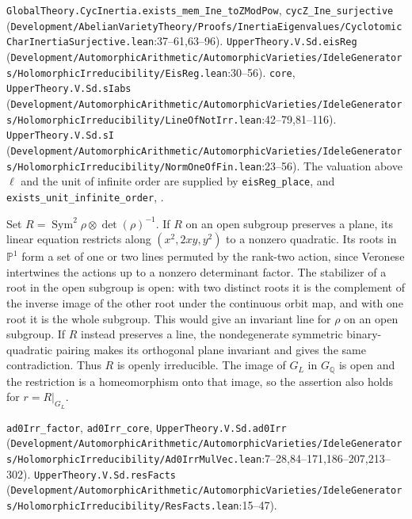 {\footnotesize \nolinkurl{GlobalTheory.CycInertia.exists_mem_Ine_toZModPow}, \nolinkurl{cycZ_Ine_surjective} (\nolinkurl{Development/AbelianVarietyTheory/Proofs/InertiaEigenvalues/CyclotomicCharInertiaSurjective.lean}\allowbreak:37--61,63--96). \nolinkurl{UpperTheory.V.Sd.eisReg} (\nolinkurl{Development/AutomorphicArithmetic/AutomorphicVarieties/IdeleGenerators/HolomorphicIrreducibility/EisReg.lean}\allowbreak:30--56). \nolinkurl{core}, \nolinkurl{UpperTheory.V.Sd.sIabs} (\nolinkurl{Development/AutomorphicArithmetic/AutomorphicVarieties/IdeleGenerators/HolomorphicIrreducibility/LineOfNotIrr.lean}\allowbreak:42--79,81--116). \nolinkurl{UpperTheory.V.Sd.sI} (\nolinkurl{Development/AutomorphicArithmetic/AutomorphicVarieties/IdeleGenerators/HolomorphicIrreducibility/NormOneOfFin.lean}\allowbreak:23--56).}
{\footnotesize The valuation above $\ell$ and the unit of infinite order are supplied by \nolinkurl{eisReg_place},  and \nolinkurl{exists_unit_infinite_order}, .}

Set $R=\operatorname{Sym}^2\rho\otimes\det(\rho)^{-1}$. If $R$ on an open subgroup preserves a plane, its linear equation restricts along $(x^2,2xy,y^2)$ to a nonzero quadratic. Its roots in $\mathbb P^1$ form a set of one or two lines permuted by the rank-two action, since Veronese intertwines the actions up to a nonzero determinant factor. The stabilizer of a root in the open subgroup is open: with two distinct roots it is the complement of the inverse image of the other root under the continuous orbit map, and with one root it is the whole subgroup. This would give an invariant line for $\rho$ on an open subgroup. If $R$ instead preserves a line, the nondegenerate symmetric binary-quadratic pairing makes its orthogonal plane invariant and gives the same contradiction. Thus $R$ is openly irreducible. The image of $G_L$ in $G_{\mathbb Q}$ is open and the restriction is a homeomorphism onto that image, so the assertion also holds for $r=R|_{G_L}$.

{\footnotesize \nolinkurl{ad0Irr_factor}, \nolinkurl{ad0Irr_core}, \nolinkurl{UpperTheory.V.Sd.ad0Irr} (\nolinkurl{Development/AutomorphicArithmetic/AutomorphicVarieties/IdeleGenerators/HolomorphicIrreducibility/Ad0IrrMulVec.lean}\allowbreak:7--28,84--171,186--207,213--302). \nolinkurl{UpperTheory.V.Sd.resFacts} (\nolinkurl{Development/AutomorphicArithmetic/AutomorphicVarieties/IdeleGenerators/HolomorphicIrreducibility/ResFacts.lean}\allowbreak:15--47).}

